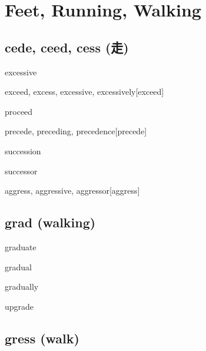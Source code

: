 \chapter{Feet, Running, Walking}

\section{cede, ceed, cess (走)}

\begin{wordRef}{excessive}
\end{wordRef}

\begin{wordRef}{exceed, excess, excessive, excessively}[exceed]
\end{wordRef}

\begin{wordRef}{proceed}
\end{wordRef}

\begin{wordRef}{precede, preceding, precedence}[precede]
\end{wordRef}

\begin{wordRef}{succession}
\end{wordRef}

\begin{wordRef}{successor}
\end{wordRef}

\begin{wordRef}{aggress, aggressive, aggressor}[aggress]
\end{wordRef}

\section{grad (walking)}

\begin{wordRef}{graduate}
\end{wordRef}

\begin{wordRef}{gradual}
\end{wordRef}

\begin{wordRef}{gradually}
\end{wordRef}

\begin{wordRef}{upgrade}
\end{wordRef}

\section{gress (walk)}

